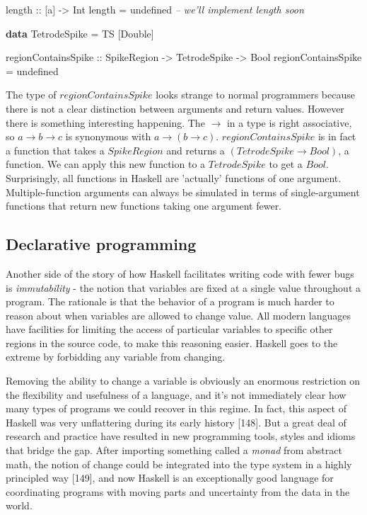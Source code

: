\documentclass[]{article}
\newenvironment{Shaded}{}{}
\newcommand{\KeywordTok}[1]{\textcolor[rgb]{0.00,0.44,0.13}{\textbf{{#1}}}}
\newcommand{\DataTypeTok}[1]{\textcolor[rgb]{0.56,0.13,0.00}{{#1}}}
\newcommand{\CommentTok}[1]{\textcolor[rgb]{0.38,0.63,0.69}{\textit{{#1}}}}
\newcommand{\OtherTok}[1]{\textcolor[rgb]{0.00,0.44,0.13}{{#1}}}
\newcommand{\FunctionTok}[1]{\textcolor[rgb]{0.02,0.16,0.49}{{#1}}}
\newcommand{\NormalTok}[1]{{#1}}
\begin{document}
\begin{Shaded}
\begin{Highlighting}[]
\NormalTok{length}\OtherTok{ ::} \NormalTok{[a] }\OtherTok{->} \DataTypeTok{Int}
\NormalTok{length }\FunctionTok{=}  \NormalTok{undefined   }\CommentTok{-- we'll implement length soon}

\KeywordTok{data} \DataTypeTok{TetrodeSpike} \FunctionTok{=} \DataTypeTok{TS} \NormalTok{[}\DataTypeTok{Double}\NormalTok{]}

\OtherTok{regionContainsSpike ::} \DataTypeTok{SpikeRegion} \OtherTok{->} \DataTypeTok{TetrodeSpike} \OtherTok{->} \DataTypeTok{Bool}
\NormalTok{regionContainsSpike }\FunctionTok{=}  \NormalTok{undefined}
\end{Highlighting}
\end{Shaded}

\doublespacing

The type of \(regionContainsSpike\) looks strange to normal programmers
because there is not a clear distinction between arguments and return
values. However there is something interesting happening. The
\(\rightarrow\) in a type is right associative, so
\(a \rightarrow b \rightarrow c\) is synonymous with
\(a \rightarrow (b \rightarrow c)\). \(regionContainsSpike\) is in fact
a function that takes a \(SpikeRegion\) and returns a
\((TetrodeSpike \rightarrow Bool)\), a function. We can apply this new
function to a \(TetrodeSpike\) to get a \(Bool\). Surprisingly, all
functions in Haskell are 'actually' functions of one argument.
Multiple-function arguments can always be simulated in terms of
single-argument functions that return new functions taking one argument
fewer.

\subsection{Declarative programming}

Another side of the story of how Haskell facilitates writing code with
fewer bugs is \emph{immutability} - the notion that variables are fixed
at a single value throughout a program. The rationale is that the
behavior of a program is much harder to reason about when variables are
allowed to change value. All modern languages have facilities for
limiting the access of particular variables to specific other regions in
the source code, to make this reasoning easier. Haskell goes to the
extreme by forbidding any variable from changing.

Removing the ability to change a variable is obviously an enormous
restriction on the flexibility and usefulness of a language, and it's
not immediately clear how many types of programs we could recover in
this regime. In fact, this aspect of Haskell was very unflattering
during its early history {[}148{]}. But a great deal of research and
practice have resulted in new programming tools, styles and idioms that
bridge the gap. After importing something called a \emph{monad} from
abstract math, the notion of change could be integrated into the type
system in a highly principled way {[}149{]}, and now Haskell is an
exceptionally good language for coordinating programs with moving parts
and uncertainty from the data in the world.
\end{document}
